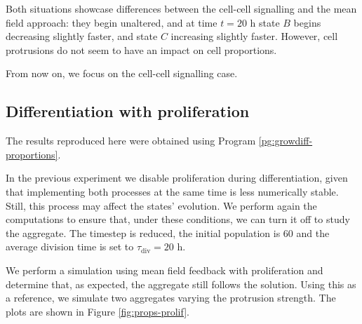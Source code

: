 Both situations showcase differences between the cell-cell signalling and the mean field approach: they begin unaltered, and at time $t=20\text{ h}$ state $B$ begins decreasing slightly faster, and state $C$ increasing slightly faster. However, cell protrusions do not seem to have an impact on cell proportions.

From now on, we focus on the cell-cell signalling case.


\subsection{Differentiation with proliferation}\label{sec:diff-prol}

The results reproduced here were obtained using Program \ref{pg:growdiff-proportions}.

In the previous experiment we disable proliferation during differentiation, gi\-ven that implementing both processes at the same time is less numerically stable. Still, this process may affect the states' evolution. We perform again the computations to ensure that, under these conditions, we can turn it off to study the aggregate. The time\-step is reduced, the initial population is $60$ and the average division time is set to $\tau_\text{div}=20\text{ h}$.

We perform a simulation using mean field feedback with proliferation and determine that, as expected, the aggregate still follows the solution. Using this as a reference, we simulate two aggregates varying the protrusion strength. The plots are shown in Figure \ref{fig:props-prolif}.

